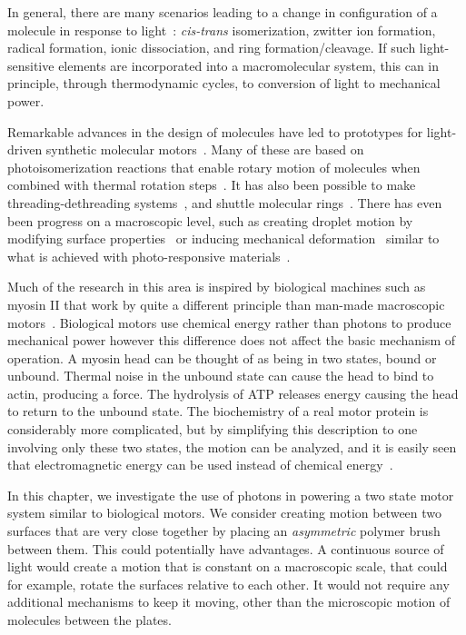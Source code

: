 \documentclass[11pt]{ucthesis}
\begin{document}
In general, there are many scenarios leading to a change in configuration of a molecule in
response to light~\cite{Irie}: {\em cis-trans} isomerization, zwitter ion formation, radical
formation, ionic dissociation, and ring formation/cleavage. If such
light-sensitive elements are incorporated into a macromolecular system, this can
in principle, through thermodynamic cycles, to conversion of light to
mechanical power.

Remarkable advances in the design of molecules have led to prototypes for
light-driven synthetic molecular motors~\cite{credi2006}. Many of these are
based on photoisomerization reactions that enable rotary motion of molecules
when combined with thermal rotation steps~\cite{terWiel2005,Ruangsupapichat,Vicario,credi2006}. 
It has also been possible to make threading-dethreading systems~\cite{Ashton1998,credi2006},
and shuttle molecular rings~\cite{Ashton2000,credi2006}. There has even been
progress on a macroscopic level, such as creating droplet motion by modifying surface
properties~\cite{Berna} or inducing mechanical deformation~\cite{Liu} similar to
what is achieved with photo-responsive materials~\cite{IrieKunwatchakun,Irie,SuzukiHirasa,BehlLendlein,RoyGupta}.

Much of the research in this area is inspired by biological machines such as myosin II that work by
quite a different principle than man-made macroscopic motors~\cite{BustamanteKellerOster}. Biological
motors use chemical energy rather than photons to produce mechanical power however this
difference does not affect the basic mechanism of operation. A myosin
head can be thought of as being in two states, bound or unbound. Thermal noise in the unbound state can cause
the head to bind to actin, producing a force. The hydrolysis of ATP releases energy
causing the head to return to the unbound state.  
The biochemistry of a real motor protein is considerably more complicated, but
by simplifying this description to one involving only these two states,
the motion can be analyzed, and 
it is easily seen that electromagnetic energy can be used instead of chemical
energy~\cite{ProstPRL}. 

In this chapter, we investigate the use of photons in powering a two state motor
system similar to biological motors. We consider
creating motion between two surfaces that are very close together by placing
an {\em asymmetric} polymer brush between them.
This could potentially have advantages. A continuous source of light would create
a motion that is constant on a macroscopic scale, that could for example, rotate
the surfaces relative to each other. It would not require any additional
mechanisms to keep it moving, other than the microscopic motion of molecules
between the plates. 
\end{document}
